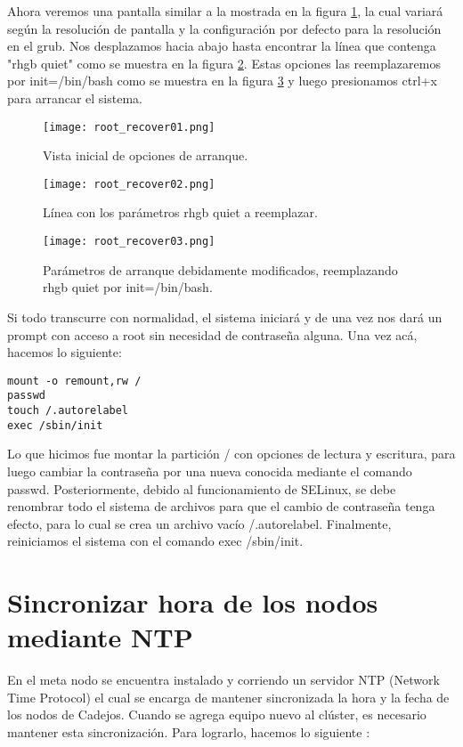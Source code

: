 Ahora veremos una pantalla similar a la mostrada en la figura \ref{fig:rootrecover:01}, la cual variará según la resolución de pantalla y la configuración por defecto para la resolución en el grub. Nos desplazamos hacia abajo hasta encontrar la línea que contenga "rhgb quiet" como se muestra en la figura \ref{fig:rootrecover:02}. Estas opciones las reemplazaremos por init=/bin/bash como se muestra en la figura \ref{fig:rootrecover:03} y luego presionamos ctrl+x para arrancar el sistema.

\begin{figure}[H]
\centering
\texttt{[image: root\_recover01.png]}
\caption{Vista inicial de opciones de arranque.}
\label{fig:rootrecover:01}
\end{figure}

\begin{figure}[H]
\centering
\texttt{[image: root\_recover02.png]}
\caption{Línea con los parámetros rhgb quiet a reemplazar.}
\label{fig:rootrecover:02}
\end{figure}

\begin{figure}[H]
\centering
\texttt{[image: root\_recover03.png]}
\caption{Parámetros de arranque debidamente modificados, reemplazando rhgb quiet por init=/bin/bash.}
\label{fig:rootrecover:03}
\end{figure}
Si todo transcurre con normalidad, el sistema iniciará y de una vez nos dará un prompt con acceso a root sin necesidad de contraseña alguna. Una vez acá, hacemos lo siguiente:

\begin{lstlisting} 
mount -o remount,rw /
passwd
touch /.autorelabel
exec /sbin/init
\end{lstlisting}

Lo que hicimos fue montar la partición / con opciones de lectura y escritura, para luego cambiar la contraseña por una nueva conocida mediante el comando passwd. Posteriormente, debido al funcionamiento de SELinux, se debe renombrar todo el sistema de archivos para que el cambio de contraseña tenga efecto, para lo cual se crea un archivo vacío /.autorelabel. Finalmente, reiniciamos el sistema con el comando exec /sbin/init.

\section{Sincronizar hora de los nodos mediante NTP}
En el meta nodo se encuentra instalado y corriendo un servidor NTP (Network Time Protocol) el cual se encarga de mantener sincronizada la hora y la fecha de los nodos de Cadejos. Cuando se agrega equipo nuevo al clúster, es necesario mantener esta sincronización. Para lograrlo, hacemos lo siguiente \cite{ntpclient}:

